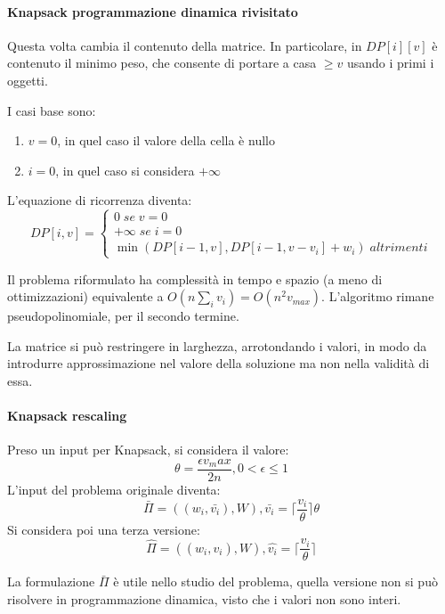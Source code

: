 \paragraph{Knapsack programmazione dinamica rivisitato}
Questa volta cambia il contenuto della matrice.
In particolare, in $DP[i][v]$ è contenuto il minimo peso, che 
consente di portare a casa $\geq v$ usando i primi i oggetti.

I casi base sono:
\begin{enumerate}
    \item $v = 0$, in quel caso il valore della cella è nullo
    \item $i = 0$, in quel caso si considera $+\infty$
\end{enumerate}

L'equazione di ricorrenza diventa: 
\[
    DP[i,v] = 
    \begin{cases}
        0\; \mathit{se}\; v = 0\\
        +\infty\; \mathit{se}\; i = 0\\
        \min(DP[i-1,v], DP[i-1,v-v_i] + w_i)\;\mathit{altrimenti}
    \end{cases}\]

\begin{theorem}
    Il problema riformulato ha complessità in tempo e spazio (a meno di ottimizzazioni) equivalente a 
    $O(n\sum_i v_i) = O(n^2v_{max})$. L'algoritmo rimane pseudopolinomiale, per il secondo termine.
\end{theorem}

\begin{remark}
    La matrice si può restringere in larghezza, arrotondando i valori, in modo da introdurre approssimazione
    nel valore della soluzione ma non nella validità di essa.
\end{remark}

\paragraph{Knapsack rescaling}
Preso un input per Knapsack, si considera il valore:
$$\theta = \frac{\epsilon v_max}{2n}, 0 < \epsilon \leq 1$$
L'input del problema originale diventa:
$$\bar{\Pi} = ((w_i, \bar{v_i}), W), \bar{v_i} = \lceil\frac{v_i}{\theta}\rceil\theta$$
Si considera poi una terza versione:
$$\hat{\Pi} = ((w_i, \hat{v_i}), W), \hat{v_i} = \lceil\frac{v_i}{\theta}\rceil$$

La formulazione $\bar{\Pi}$ è utile nello studio del problema, quella versione non 
si può risolvere in programmazione dinamica, visto che i valori non sono interi.

